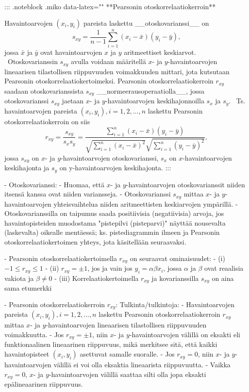 \documentclass[
]{book}
\begin{document}
\begin{itemize}
::: {.noteblock .miko data-latex="{}"}
**Pearsonin otoskorrelaatiokerroin**

Havaintoarvojen $(x_i, y_i)$ pareista laskettu __otoskovarianssi__ on
$$
s_{xy} = \frac{1}{n-1} \sum_{i=1}^{n} (x_i - \bar{x}) (y_i - \bar{y}),
$$
jossa $\bar{x}$ ja $\bar{y}$ ovat havaintoarvojen $x$ ja $y$ aritmeettiset keskiarvot.
\
Otoskovarianssin $s_{xy}$ avulla voidaan määritellä $x$- ja $y$-havaintoarvojen lineaarisen tilastollisen riippuvuuden voimakkuuden mittari, jota kutsutaan Pearsonin otoskorrelaatiokertoimeksi. Pearsonin otoskorrelaatiokerroin $r_{xy}$ saadaan otoskovarianssista $s_{xy}$ __normeerausoperaatiolla__, jossa otoskovarianssi $s_{xy}$ jaetaan $x$- ja $y$-havaintoarvojen keskihajonnoilla $s_x$ ja $s_y$. 
\
Ts. havaintoarvojen pareista $(x_i, y_i), i = 1, 2, \ldots, n$ laskettu Pearsonin otoskorrelaatiokerroin on siis
$$
r_{xy} = \frac{s_{xy}}{s_x s_y} = \frac{\sum_{i=1}^{n} (x_i - \bar{x}) (y_i - \bar{y})}{\sqrt{\sum_{i=1}^{n} (x_i - \bar{x})^2} \sqrt{\sum_{i=1}^{n} (y_i - \bar{y})^2}} , 
$$
jossa $s_{xy}$ on $x$- ja $y$-havaintoarvojen otoskovarianssi, $s_x$ on $x$-havaintoarvojen keskihajonta ja $s_y$ on y-havaintoarvojen keskihajonta.
:::

- Otoskovarianssi:
  - Huomaa, että $x$- ja $y$-havaintoarvojen otoskovarianssit niiden itsensä kanssa ovat niiden variansseja.
  - Otoskovarianssi $s_{xy}$ mittaa $x$- ja $y$-havaintoarvojen yhteisvaihtelua niiden aritmeettisten keskiarvojen ympärillä.
  - Otoskovarianssilla on taipumus saada positiivisia (negatiivisia) arvoja, jos havaintopisteiden muodostama "pistepilvi (pisteparvi)" näyttää nousevalta (laskevalta) oikealle mentäessä; ks. pistediagrammin ilmeen ja Pearsonin otoskorrelaatiokertoimen yhteys, jota käsitellään seuraavaksi.

- Pearsonin otoskorrelaatiokertoimella $r_{xy}$ on seuraavat ominaisuudet:
  - (i) $-1 \le r_{xy} \le 1$
  - (ii) $r_{xy} = \pm 1$, jos ja vain jos $y_i = \alpha \beta x_i$, jossa $\alpha$ ja $\beta$  ovat reaalisia vakiota ja $\beta \neq 0$
  - (iii)   Korrelaatiokertoimella $r_{xy}$ ja kovarianssilla $s_{xy}$ on aina sama etumerkki

- Pearsonin otoskorrelaatiokerroin $r_{xy}$: Tulkinta/tulkintoja:
  - Havaintoarvojen pareista $(x_i, y_i), i = 1,2, \ldots, n$ laskettu Pearsonin otoskorrelaatiokerroin $r_{xy}$ mittaa $x$- ja $y$-havaintoarvojen lineaarisen tilastollisen riippuvuuden voimakkuutta.
  - Jos $r_{xy} = \pm 1$, niin $x$- ja $y$-havaintoarvojen välillä on eksakti eli funktionaalinen lineaarinen riippuvuus, mikä merkitsee sitä, että kaikki havaintopisteet $(x_i, y_i)$ asettuvat samalle suoralle.
  - Jos $r_{xy} = 0$, niin $x$- ja $y$-havaintoarvojen välillä ei voi olla eksaktia lineaarista riippuvuutta.
  - Vaikka $r_{xy} = 0$, $x$- ja $y$-havaintoarvojen välillä saattaa silti olla jopa eksakti epälineaarinen riippuvuus.


\end{itemize}
\end{document}
